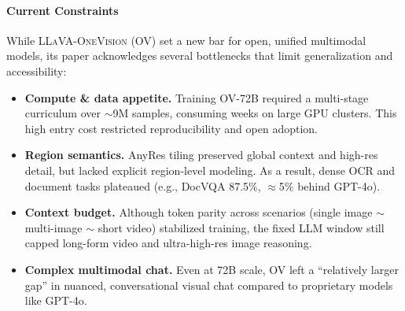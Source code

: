 \begin{enrichment}
\begin{enrichment}
        \paragraph{Current Constraints}
        While \textsc{LLaVA-OneVision} (OV) set a new bar for open, unified multimodal models, its paper acknowledges several bottlenecks that limit generalization and accessibility:
        \begin{itemize}
            \item \textbf{Compute \& data appetite.} Training OV-72B required a multi-stage curriculum over $\sim$9M samples, consuming weeks on large GPU clusters. This high entry cost restricted reproducibility and open adoption.
            \item \textbf{Region semantics.} AnyRes tiling preserved global context and high-res detail, but lacked explicit region-level modeling. As a result, dense OCR and document tasks plateaued (e.g., DocVQA 87.5\%, $\approx$5\% behind GPT-4o).
            \item \textbf{Context budget.} Although token parity across scenarios (single image $\sim$ multi-image $\sim$ short video) stabilized training, the fixed LLM window still capped long-form video and ultra-high-res image reasoning.
            \item \textbf{Complex multimodal chat.} Even at 72B scale, OV left a “relatively larger gap” in nuanced, conversational visual chat compared to proprietary models like GPT-4o.
        \end{itemize}
        

\end{enrichment}
\end{enrichment}
